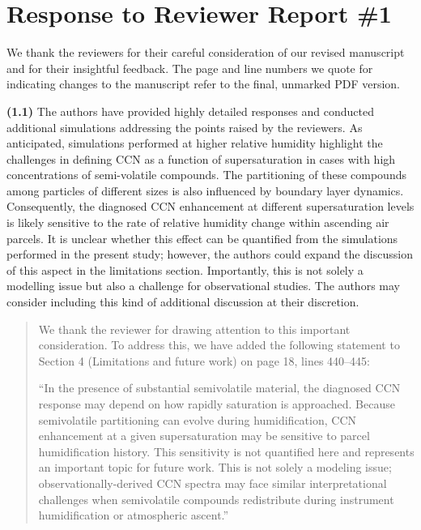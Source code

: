 \documentclass{article}
\begin{document}

\section*{Response to Reviewer Report \#1}
We thank the reviewers for their careful consideration of our revised manuscript and for their insightful feedback. The page and line numbers we quote for indicating changes to the manuscript refer to the final, unmarked PDF version. 
 

\textbf{(1.1)} The authors have provided highly detailed responses and conducted additional simulations addressing the points raised by the reviewers. As anticipated, simulations performed at higher relative humidity highlight the challenges in defining CCN as a function of supersaturation in cases with high concentrations of semi-volatile compounds. The partitioning of these compounds among particles of different sizes is also influenced by boundary layer dynamics. Consequently, the diagnosed CCN enhancement at different supersaturation levels is likely sensitive to the rate of relative humidity change within ascending air parcels. It is unclear whether this effect can be quantified from the simulations performed in the present study; however, the authors could expand the discussion of this aspect in the limitations section. Importantly, this is not solely a modelling issue but also a challenge for observational studies. The authors may consider including this kind of additional discussion at their discretion.

\begin{quote}
  We thank the reviewer for drawing attention to this important consideration. To address this, we have added the following statement to Section 4 (Limitations and future work) on page 18, lines 440--445:
  
  ``In the presence of substantial semivolatile material, the diagnosed CCN response may depend on how rapidly saturation is approached. Because semivolatile partitioning can evolve during humidification, CCN enhancement at a given supersaturation may be sensitive to parcel humidification history. This sensitivity is not quantified here and represents an important topic for future work. This is not solely a modeling issue; observationally-derived CCN spectra may face similar interpretational challenges when semivolatile compounds redistribute during instrument humidification or atmospheric ascent.''
\end{quote}
\end{document}
